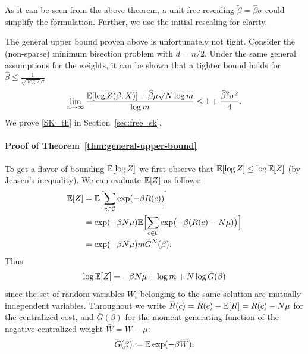 % 
\myremark As it can be seen from the above theorem, a unit-free rescaling 
$\tilde \beta = \hat \beta \sigma$ could simplify the formulation. Further,
we use the initial rescaling for clarity.


\myremark The general upper bound proven  above
is unfortunately not tight. Consider the (non-sparse) minimum bisection
problem with $d=n/2$. Under the same general assumptions for the weights,
it can be shown that a tighter bound holds for $\hat{\beta} \leq
\frac{1}{\sqrt{\log 2}\sigma}$
\begin{equation}
\label{SK_th}
  \lim_{n\to \infty} \frac{{\mathbb{E}}[\log Z(\beta, X)] +\widehat \beta \mu \sqrt{N\log m}}{\log m}
    \leq 1 + \frac{\widehat{\beta}^2\sigma^2}{4}.
\end{equation}
We prove \eqref{SK_th} in Section~\ref{sec:free_sk}. \QEDA
\par
\medskip

\paragraph{Proof of Theorem~\ref{thm:general-upper-bound}} 
To get a flavor of bounding $\mathbb{E}[ \log Z]$ we first observe that  $\mathbb{E}[
\log Z] \leq \log \mathbb{E}[ Z]$ (by Jensen's inequality). We can evaluate 
$\mathbb{E}[Z]$ as follows:
\begin{align}
  \mathbb{E}[Z] &= \mathbb{E}\Bigl[\sum_{c\in {\cal C}} \exp(-\beta R(c))\Bigr] \notag \\
    &= \exp(-\beta N \mu) \mathbb{E}\Bigl[\sum_{c\in {\cal C}} \exp\bigl(-\beta
      (R(c)-N\mu)\bigr)\Bigr] \notag \\ 
    &=\exp(-\beta N \mu) m \mspace{2mu}\overline{\mspace{-2mu}G\mspace{-2mu}}\mspace{2mu}^N(\beta).
\end{align}
Thus
\begin{equation}
\label{spa1}
\log \mathbb{E}[Z]=-\beta N \mu+ \log m + N \log \mspace{2mu}\overline{\mspace{-2mu}G\mspace{-2mu}}\mspace{2mu}(\beta)
\end{equation}
since the set of random variables $W_i$ belonging to the same solution  
are mutually independent variables.
Throughout we write $\mspace{2mu}\overline{\mspace{-2mu}R\mspace{-2mu}}\mspace{2mu}(c)=R(c)-\mathbb{E}[R]=R(c) -N\mu$ for the 
centralized cost, and $\bar G(\beta)$ for the moment generating function of 
the negative centralized weight $\bar W=W - \mu$:
\begin{equation}
  \mspace{2mu}\overline{\mspace{-2mu}G\mspace{-2mu}}\mspace{2mu}(\beta) \coloneqq \mathbb{E} \exp(-\beta \mspace{2mu}\overline{\mspace{-2mu}W\mspace{-2mu}}\mspace{2mu}).
\end{equation}
%

